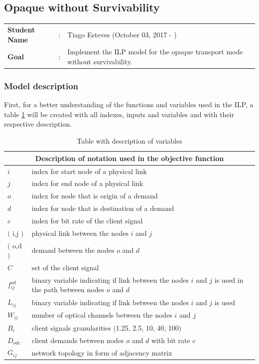 \clearpage

\subsection{Opaque without Survivability}\label{ILP_Opaque_Survivability}
\begin{tcolorbox}	
\begin{tabular}{p{2.75cm} p{0.2cm} p{10.5cm}} 	
\textbf{Student Name}  &:& Tiago Esteves    (October 03, 2017 - )\\
\textbf{Goal}          &:& Implement the ILP model for the opaque transport mode without survivability.
\end{tabular}
\end{tcolorbox}

\subsubsection{Model description}

First, for a better understanding of the functions and variables used in the ILP, a table \ref{description_opaque} will be created with all indexes, inputs and variables and with their respective description.\\

\begin{table}[h!]
\centering
\begin{tabular}{ |p{1cm}||p{13cm}|}
 \hline
 \multicolumn{2}{|c|}{Description of notation used in the objective function} \\
 \hline
 \hline
 $i$ & index for start node of a physical link \\
 $j$ & index for end node of a physical link \\
 $o$ & index for node that is origin of a demand \\
 $d$ & index for node that is destination of a demand \\
 $c$ & index for bit rate of the client signal \\
 $($ i,j $)$ & physical link between the nodes $i$ and $j$ \\
 $($ o,d $)$ & demand between the nodes $o$ and $d$ \\
 $C$ & set of the client signal \\
 $f_{ij}^{od}$ & binary variable indicating if link between the nodes $i$ and $j$ is used in the path between nodes $o$ and $d$ \\
 $L_{ij}$ & binary variable indicating if link between the nodes $i$ and $j$ is used \\
 $W_{ij}$ & number of optical channels between the nodes $i$ and $j$\\
 $B_c $ & client signals granularities $($1.25, 2.5, 10, 40, 100$)$ \\
 $D_{odc}$ & client demands between nodes $o$ and $d$ with bit rate $c$\\
 $G_{ij}$ & network topology in form of adjacency matrix \\
 \hline
\end{tabular}
\caption{Table with description of variables}
\label{description_opaque}
\end{table}

